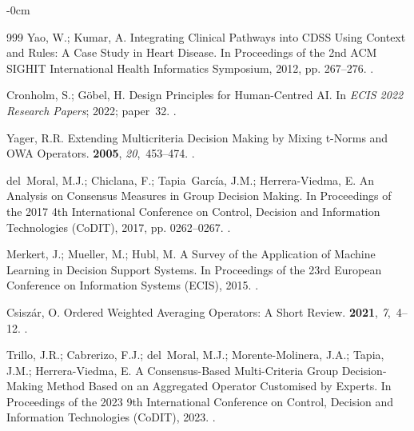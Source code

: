 \documentclass[mathematics,article,submit,moreauthors]{Definitions/mdpi}
\begin{document}
\begin{adjustwidth}{-\extralength}{0cm}
\begin{thebibliography}{999}
    Yao, W.; Kumar, A.
    \newblock Integrating Clinical Pathways into {CDSS} Using Context and Rules: A
    Case Study in Heart Disease.
    \newblock In Proceedings of the 2nd ACM SIGHIT International Health Informatics
    Symposium, 2012, pp. 267--276.
    .

    Cronholm, S.; G{\"o}bel, H.
    \newblock Design Principles for Human-Centred {AI}.
    \newblock In {\em ECIS 2022 Research Papers}; 2022; paper~32.
    .

    Yager, R.R.
    \newblock Extending Multicriteria Decision Making by Mixing t-Norms and {OWA}
    Operators.
     {\bf 2005}, {\em
        20},~453--474.
    .

    del~Moral, M.J.; Chiclana, F.; Tapia~Garc{\'i}a, J.M.; Herrera-Viedma, E.
    \newblock An Analysis on Consensus Measures in Group Decision Making.
    \newblock In Proceedings of the 2017 4th International Conference on Control,
    Decision and Information Technologies ({CoDIT}), 2017, pp. 0262--0267.
    .

    Merkert, J.; Mueller, M.; Hubl, M.
    \newblock A Survey of the Application of Machine Learning in Decision Support
    Systems.
    \newblock In Proceedings of the 23rd European Conference on Information Systems
    ({ECIS}), 2015.
    .

    Csisz{\'a}r, O.
    \newblock Ordered Weighted Averaging Operators: A Short Review.
     {\bf 2021}, {\em
        7},~4--12.
    .

    Trillo, J.R.; Cabrerizo, F.J.; del~Moral, M.J.; Morente-Molinera, J.A.;
    Tapia, J.M.; Herrera-Viedma, E.
    \newblock A Consensus-Based Multi-Criteria Group Decision-Making Method Based
    on an Aggregated Operator Customised by Experts.
    \newblock In Proceedings of the 2023 9th International Conference on Control,
    Decision and Information Technologies ({CoDIT}), 2023.
    .

\end{thebibliography}
\PublishersNote{}
\end{adjustwidth}
\end{document}
